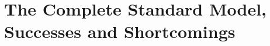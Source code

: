 \section{The Complete Standard Model, Successes and Shortcomings}
\label{sec:final_sm_description}


